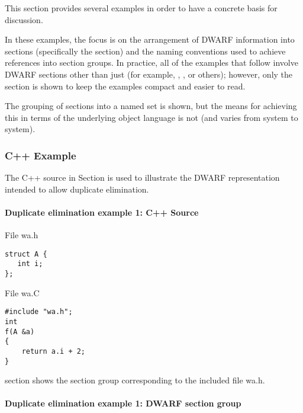 This section provides several examples in order to have a
concrete basis for discussion.

In these examples, the focus is on the arrangement of DWARF
information into sections (specifically the 
section) and the naming conventions used to achieve references
into section groups. In practice, all of the examples that
follow involve DWARF sections other than just 
(for example, , 
, or others);
however, only the 
section is shown to keep the
examples compact and easier to read.

The grouping of sections into a named set is shown, but the means for achieving this in terms of
the underlying object language is not (and varies from system to system).

\subsubsection{C++ Example}

The C++ source in 
Section 
is used to illustrate the DWARF
representation intended to allow duplicate elimination.

\paragraph{Duplicate elimination example 1: C++ Source} 
\label{app:duplicateeliminationexample1csource}

File wa.h

\begin{lstlisting}
struct A {
   int i;
};
\end{lstlisting}

File wa.C

\begin{lstlisting}
#include "wa.h";
int
f(A &a)
{
    return a.i + 2;
}
\end{lstlisting}


section 
shows the section group corresponding to the included file 
wa.h.


\paragraph{Duplicate elimination example 1: DWARF section group} 

